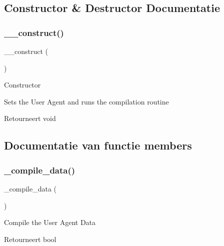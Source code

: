 \subsection{Constructor \& Destructor Documentatie}
\mbox{\label{class_c_i___user__agent_a095c5d389db211932136b53f25f39685}} 
\subsubsection{\texorpdfstring{\_\_construct()}{\_\_construct()}}
{\footnotesize\ttfamily \+\_\+\+\_\+construct (\begin{DoxyParamCaption}{ }\end{DoxyParamCaption})}

Constructor

Sets the User Agent and runs the compilation routine

\begin{DoxyReturn}{Retourneert}
void 
\end{DoxyReturn}


\subsection{Documentatie van functie members}
\mbox{\label{class_c_i___user__agent_a4ced3acbcc2ab5e599f212c676590d06}} 
\subsubsection{\texorpdfstring{\_compile\_data()}{\_compile\_data()}}
{\footnotesize\ttfamily \+\_\+compile\+\_\+data (\begin{DoxyParamCaption}{ }\end{DoxyParamCaption})\hspace{0.3cm}{\ttfamily [protected]}}

Compile the User Agent Data

\begin{DoxyReturn}{Retourneert}
bool 
\end{DoxyReturn}
\mbox{\label{class_c_i___user__agent_a96ec01490c667b47c5faec7cb53c34b2}} 
